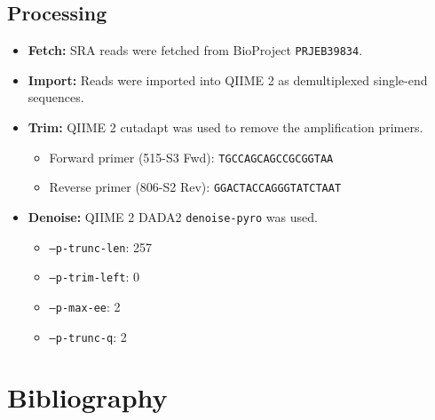 \documentclass[11pt,a4paper]{article}
\begin{document}
\subsection{Processing}
\begin{itemize}

\item \textbf{Fetch:} SRA reads were fetched from BioProject \texttt{PRJEB39834}.
\item \textbf{Import:} Reads were imported into QIIME 2 as demultiplexed single-end sequences.
\item \textbf{Trim:} QIIME 2 cutadapt was used to remove the amplification primers.
  \begin{itemize}
  \item Forward primer (515-S3 Fwd): \texttt{TGCCAGCAGCCGCGGTAA}
  \item Reverse primer (806-S2 Rev): \texttt{GGACTACCAGGGTATCTAAT}
  \end{itemize}
\item \textbf{Denoise:} QIIME 2 DADA2 \texttt{denoise-pyro} was used.
  \begin{itemize}
  \item \texttt{--p-trunc-len}: 257
  \item \texttt{--p-trim-left}: 0
  \item \texttt{--p-max-ee}: 2
  \item \texttt{--p-trunc-q}: 2
  \end{itemize}
\end{itemize}


\newpage
\section{Bibliography}
\printbibliography[heading=bibintoc]
\end{document}
